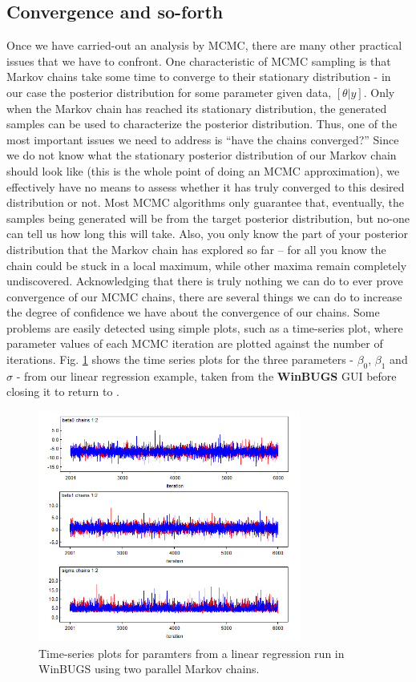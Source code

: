 \subsection{Convergence and so-forth}
\label{glms.sec.convergence}

Once we have carried-out an analysis by MCMC, there are many other
practical issues that we have to confront. One characteristic of MCMC sampling is that Markov chains take some time to converge to their stationary distribution - in our case the posterior distribution for some parameter given  data, $[\theta|y]$. Only when the Markov chain has reached
its stationary distribution, the generated samples can be used to
characterize the posterior distribution. Thus, one of the most important issues we need to address 
is ``have the chains converged?'' Since we do not know what the
stationary posterior distribution of our Markov chain should look like
(this is the whole point of doing an MCMC approximation), we
effectively have no means to assess whether it has truly converged to
this desired distribution or not. Most MCMC algorithms only guarantee
that, eventually, the samples being generated will be from the target
posterior distribution, but no-one can tell us how long this will
take. Also, you only know the part of your posterior distribution that
the Markov chain has explored so far -- for all you know the chain
could be stuck in a local maximum, while other maxima remain
completely undiscovered.  Acknowledging that there is truly nothing we
can do to ever prove convergence of our MCMC chains, there are several
things we can do to increase the degree of confidence we have about
the convergence of our chains. Some problems are easily detected using
simple plots, such as a time-series plot, where parameter values of each MCMC iteration are plotted against the number of iterations.  Fig. \ref{glms.fig.linreg} shows the time series plots for the three parameters - $\beta_0$, $\beta_1$ and $\sigma$ - from our linear regression example, taken from the {\bf WinBUGS} GUI before closing it to return to {\R}. 

\begin{figure}
\begin{center}
\includegraphics[height=3in]{Ch2-Bayes/figs/BUGSchains}
\end{center}
\caption{Time-series plots for paramters from a linear regression run in WinBUGS using two parallel Markov chains.}
\label{glms.fig.linreg}
\end{figure}

